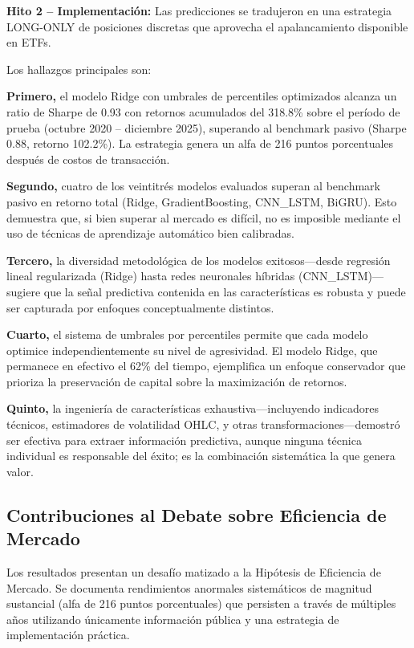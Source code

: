 \documentclass[11pt,a4paper]{article}
\begin{document}
\textbf{Hito 2 -- Implementación:} Las predicciones se tradujeron en una estrategia LONG-ONLY de posiciones discretas que aprovecha el apalancamiento disponible en ETFs.

Los hallazgos principales son:

\textbf{Primero,} el modelo Ridge con umbrales de percentiles optimizados alcanza un ratio de Sharpe de 0.93 con retornos acumulados del 318.8\% sobre el período de prueba (octubre 2020 -- diciembre 2025), superando al benchmark pasivo (Sharpe 0.88, retorno 102.2\%). La estrategia genera un alfa de 216 puntos porcentuales después de costos de transacción.

\textbf{Segundo,} cuatro de los veintitrés modelos evaluados superan al benchmark pasivo en retorno total (Ridge, GradientBoosting, CNN\_LSTM, BiGRU). Esto demuestra que, si bien superar al mercado es difícil, no es imposible mediante el uso de técnicas de aprendizaje automático bien calibradas.

\textbf{Tercero,} la diversidad metodológica de los modelos exitosos---desde regresión lineal regularizada (Ridge) hasta redes neuronales híbridas (CNN\_LSTM)---sugiere que la señal predictiva contenida en las características es robusta y puede ser capturada por enfoques conceptualmente distintos.

\textbf{Cuarto,} el sistema de umbrales por percentiles permite que cada modelo optimice independientemente su nivel de agresividad. El modelo Ridge, que permanece en efectivo el 62\% del tiempo, ejemplifica un enfoque conservador que prioriza la preservación de capital sobre la maximización de retornos.

\textbf{Quinto,} la ingeniería de características exhaustiva---incluyendo indicadores técnicos, estimadores de volatilidad OHLC, y otras transformaciones---demostró ser efectiva para extraer información predictiva, aunque ninguna técnica individual es responsable del éxito; es la combinación sistemática la que genera valor.

\subsection{Contribuciones al Debate sobre Eficiencia de Mercado}

Los resultados presentan un desafío matizado a la Hipótesis de Eficiencia de Mercado. Se documenta rendimientos anormales sistemáticos de magnitud sustancial (alfa de 216 puntos porcentuales) que persisten a través de múltiples años utilizando únicamente información pública y una estrategia de implementación práctica.
\end{document}
